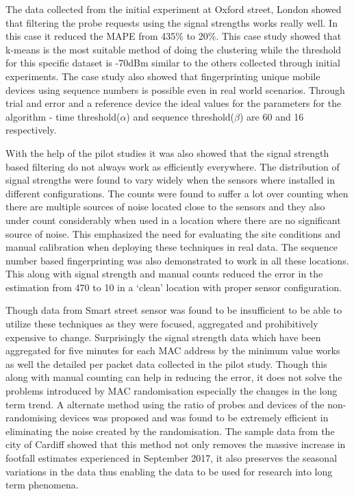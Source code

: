 The data collected from the initial experiment at Oxford street, London showed that filtering the probe requests using the signal strengths works really well.
In this case it reduced the MAPE from 435\% to 20\%.
This case study showed that k-means is the most suitable method of doing the clustering while the threshold for this specific dataset is  -70dBm similar to the others collected through initial experiments.
The case study also showed that fingerprinting unique mobile devices using sequence numbers is possible even in real world scenarios.
Through trial and error and a reference device the ideal values for the parameters for the algorithm - time threshold($\alpha$) and sequence threshold($\beta$) are 60 and 16 respectively.

With the help of the pilot studies it was also showed that the signal strength based filtering do not always work as efficiently everywhere.
The distribution of signal strengths were found to vary widely when the sensors where installed in different configurations.
The counts were found to suffer a lot over counting when there are multiple sources of noise located close to the sensors and they also under count considerably when used in a location where there are no significant source of noise.
This emphasized the need for evaluating the site conditions and manual calibration when deploying these techniques in real data.
The sequence number based fingerprinting was also demonstrated to work in all these locations.
This along with signal strength and manual counts reduced the error in the estimation from 470 to 10 in a `clean' location with proper sensor configuration.

Though data from Smart street sensor was found to be insufficient to be able to utilize these techniques as they were focused, aggregated and prohibitively expensive to change.
Surprisingly the signal strength data which have been aggregated for five minutes for each MAC address by the minimum value works as well the detailed per packet data collected in the pilot study.
Though this along with manual counting can help in reducing the error, it does not solve the problems introduced by MAC randomisation especially the changes in the long term trend.
A alternate method using the ratio of probes and devices of the non-randomising devices was proposed and was found to be extremely efficient in eliminating the noise created by the randomisation.
The sample data from the city of Cardiff showed that this method not only removes the massive increase in footfall estimates experienced in September 2017, it also preserves the seasonal variations in the data thus enabling the data to be used for research into long term phenomena.
